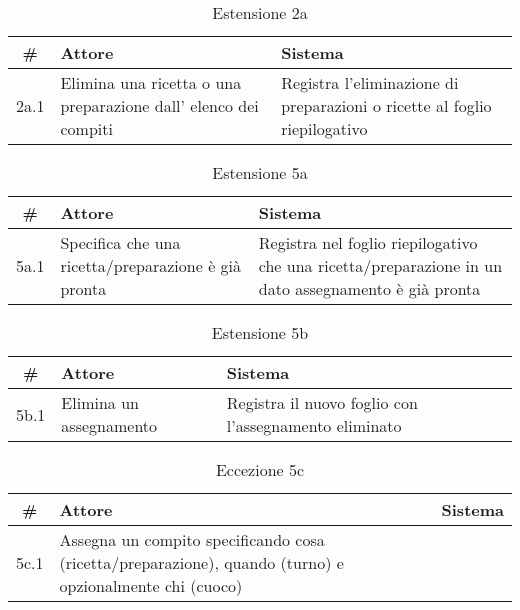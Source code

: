 \begin{table}[H]\centering\caption*{Estensione 2a}
    \small
    \begin{tabular}{|c|p{7cm}|p{6.23cm}|}
        \hline\bfseries \# & \bfseries Attore                                                             & \bfseries Sistema                                                         \\\hline
        2a.1               & Elimina una ricetta o una preparazione dall’ elenco dei compiti & Registra l’eliminazione di preparazioni o ricette al foglio riepilogativo \\\hline
    \end{tabular}
\end{table}

\begin{table}[H]\centering\caption*{Estensione 5a}
    \small
    \begin{tabular}{|c|p{7cm}|p{6.23cm}|}
        \hline\bfseries \# & \bfseries Attore                                    & \bfseries Sistema                                                                                   \\\hline
        5a.1               & Specifica che una ricetta/preparazione è già pronta & Registra nel foglio riepilogativo che una ricetta/preparazione in un dato assegnamento è già pronta \\\hline
    \end{tabular}
\end{table}

\begin{table}[H]\centering\caption*{Estensione 5b}
    \small
    \begin{tabular}{|c|p{7cm}|p{6.23cm}|}
        \hline\bfseries \# & \bfseries Attore        & \bfseries Sistema                                     \\\hline
        5b.1               & Elimina un assegnamento & Registra il nuovo foglio con l’assegnamento eliminato \\\hline
    \end{tabular}
\end{table}

\begin{table}[H]\centering\color{red}\caption*{Eccezione 5c}
    \small
    \begin{tabular}{|c|p{7cm}|p{6.23cm}|}
        \hline\bfseries \# & \bfseries Attore                                                                                        & \bfseries Sistema                                 \\\hline
        5c.1               & Assegna un compito specificando cosa (ricetta/preparazione), quando (turno) e opzionalmente chi (cuoco) & \color{red}{Cuoco non disponibile nel dato turno} \\\hline
    \end{tabular}
\end{table}